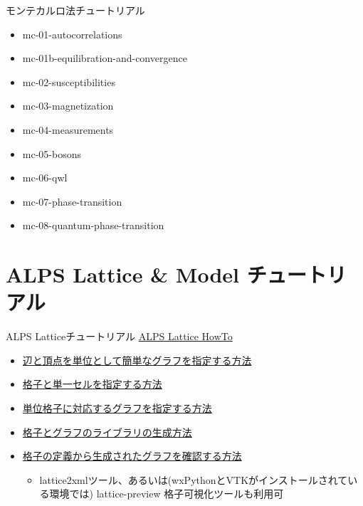 \begin{frame}{モンテカルロ法チュートリアル}
  \begin{itemize}
  \item mc-01-autocorrelations
  \item mc-01b-equilibration-and-convergence
  \item mc-02-susceptibilities
  \item mc-03-magnetization
  \item mc-04-measurements
  \item mc-05-bosons
  \item mc-06-qwl
  \item mc-07-phase-transition
  \item mc-08-quantum-phase-transition
  \end{itemize}
\end{frame}

\section{ALPS Lattice \& Model チュートリアル}

\begin{frame}{ALPS Latticeチュートリアル}
  \href{http://alps.comp-phys.org/mediawiki/index.php/Tutorials:LatticeHOWTO/ja}{ALPS Lattice HowTo} \\
  \begin{itemize}
    \item \href{http://alps.comp-phys.org/mediawiki/index.php/Tutorials:LatticeHOWTO:SimpleGraphs/ja}{辺と頂点を単位として簡単なグラフを指定する方法}
    \item \href{http://alps.comp-phys.org/mediawiki/index.php/Tutorials:LatticesAndUnitCells/ja}{格子と単一セルを指定する方法}
    \item \href{http://alps.comp-phys.org/mediawiki/index.php/Tutorials:LatticesAndGraphs/ja}{単位格子に対応するグラフを指定する方法}
    \item \href{http://alps.comp-phys.org/mediawiki/index.php/Tutorials:LatticeHOWTO:Library/ja}{格子とグラフのライブラリの生成方法}
    \item \href{http://alps.comp-phys.org/mediawiki/index.php/Tutorials:LatticeHowto:CheckLattice/ja}{格子の定義から生成されたグラフを確認する方法}
      \begin{itemize}
      \item lattice2xmlツール、あるいは(wxPythonとVTKがインストールされている環境では) lattice-preview 格子可視化ツールも利用可
      \end{itemize}
  \end{itemize}
\end{frame}

